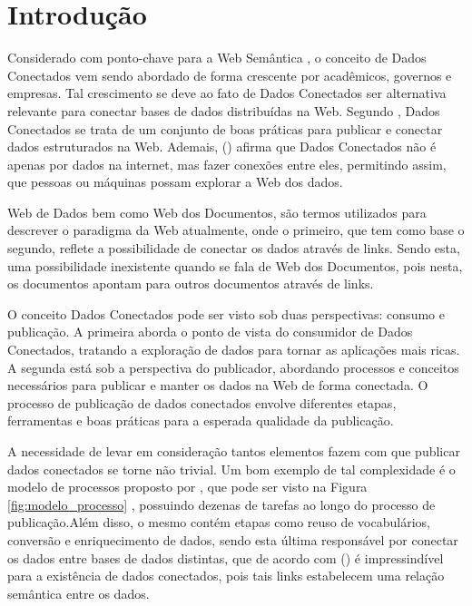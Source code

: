 \chapter{Introdução}
\label{cap:introducao}
Considerado com ponto-chave para a Web Semântica \cite{berners2001semantic}, o conceito de Dados Conectados vem sendo abordado de forma crescente por acadêmicos, governos e empresas. Tal crescimento se deve ao fato de Dados Conectados ser alternativa relevante para conectar bases de dados distribuídas na Web. Segundo \cite{hyland2011joy}, Dados Conectados se trata de um conjunto de boas práticas para publicar e conectar dados estruturados na Web. Ademais, \citeauthor{berners2006linked} (\citeyear{berners2006linked}) afirma que Dados Conectados não é apenas por dados na internet, mas fazer conexões entre eles, permitindo assim, que pessoas ou máquinas possam explorar a Web dos dados.

Web de Dados bem como Web dos Documentos, são termos utilizados para descrever o paradigma da Web atualmente, onde o primeiro, que tem como base o segundo, reflete a possibilidade de conectar os dados através de links. Sendo esta, uma possibilidade inexistente quando se fala de Web dos Documentos, pois nesta, os documentos apontam para outros documentos através de links. 

O conceito Dados Conectados pode ser visto sob duas perspectivas: consumo e publicação. A primeira aborda o ponto de vista do consumidor de Dados Conectados, tratando a exploração de dados para tornar as aplicações mais ricas. A segunda está sob a perspectiva do publicador, abordando processos \cite{bizer2007publish} \cite{hyland2011joy} \cite{villazon2011methodological} \cite{Avila2015} e conceitos \cite{berners2006linked} \cite{wood2014linked} necessários para publicar e manter os dados na Web de forma conectada. O processo de publicação de dados conectados envolve diferentes etapas, ferramentas e boas práticas para a esperada qualidade da publicação. 

A necessidade de levar em consideração tantos elementos fazem com que publicar dados conectados se torne não trivial. Um bom exemplo de tal complexidade é o modelo de processos proposto por \citeauthor{Avila2015}, que pode ser visto na Figura \ref{fig:modelo_processo} , possuindo dezenas de tarefas ao longo do processo de publicação.Além disso, o mesmo contém etapas como reuso de vocabulários, conversão  e enriquecimento de dados, sendo esta última responsável por conectar os dados entre bases de dados distintas, que de acordo com \citeauthor{berners2006linked} (\citeyear{berners2006linked}) é impressindível para a existência de dados conectados, pois tais links estabelecem uma relação semântica entre os dados.

